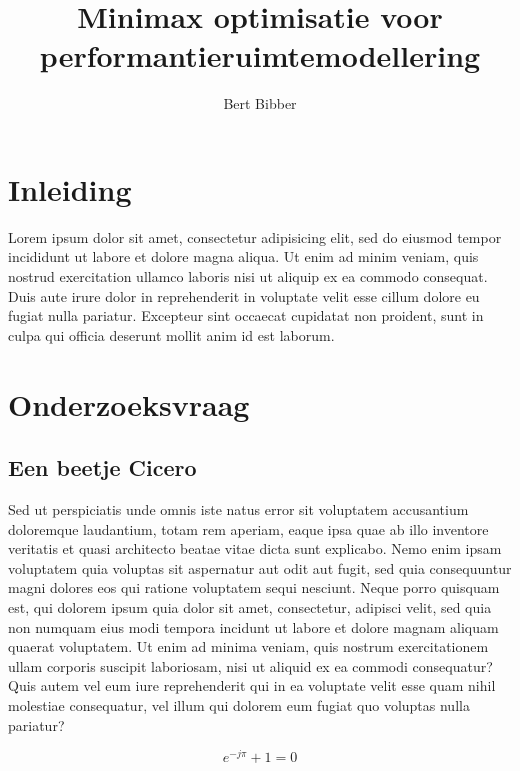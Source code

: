 \documentclass[a4paper,11pt,twoside,openright,english,copyright]{kdgmasterthesis}
\title{Minimax optimisatie voor performantieruimtemodellering}
\author{Bert Bibber}
\begin{document}

\maketitle

\frontmatter

\tableofcontents

\mainmatter
\chapter*{Inleiding}
Lorem ipsum dolor sit amet, consectetur adipisicing elit, sed do
eiusmod tempor incididunt ut labore et dolore magna aliqua. Ut enim ad
minim veniam, quis nostrud exercitation ullamco laboris nisi ut
aliquip ex ea commodo consequat. Duis aute irure dolor in
reprehenderit in voluptate velit esse cillum dolore eu fugiat nulla
pariatur. Excepteur sint occaecat cupidatat non proident, sunt in
culpa qui officia deserunt mollit anim id est laborum.

\chapter{Onderzoeksvraag}

\section{Een beetje Cicero}
Sed ut perspiciatis unde omnis iste natus error sit voluptatem
accusantium doloremque laudantium, totam rem aperiam, eaque ipsa quae
ab illo inventore veritatis et quasi architecto beatae vitae dicta
sunt explicabo. Nemo enim ipsam voluptatem quia voluptas sit
aspernatur aut odit aut fugit, sed quia consequuntur magni dolores eos
qui ratione voluptatem sequi nesciunt. Neque porro quisquam est, qui
dolorem ipsum quia dolor sit amet, consectetur, adipisci velit, sed
quia non numquam eius modi tempora incidunt ut labore et dolore magnam
aliquam quaerat voluptatem. Ut enim ad minima veniam, quis nostrum
exercitationem ullam corporis suscipit laboriosam, nisi ut aliquid ex
ea commodi consequatur? Quis autem vel eum iure reprehenderit qui in
ea voluptate velit esse quam nihil molestiae consequatur, vel illum
qui dolorem eum fugiat quo voluptas nulla pariatur?

\begin{equation}
  e^{-j\pi} + 1 = 0
\end{equation}
\end{document}
